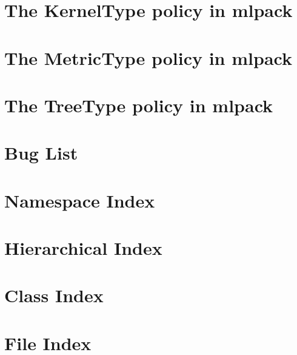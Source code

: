 \documentclass[twoside]{book}
\newcommand{\+}{\discretionary{\mbox{\scriptsize$\hookleftarrow$}}{}{}}
\begin{document}
\chapter{The Kernel\+Type policy in mlpack}
\label{kernels}

\chapter{The Metric\+Type policy in mlpack}
\label{metrics}

\chapter{The Tree\+Type policy in mlpack}
\label{trees}

\chapter{Bug List}
\label{bug}

\chapter{Namespace Index}

\chapter{Hierarchical Index}

\chapter{Class Index}

\chapter{File Index}

\end{document}

